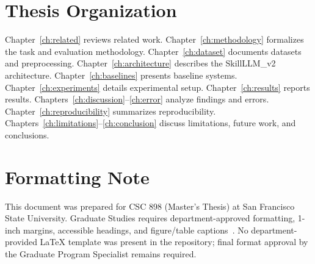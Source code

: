 \section{Thesis Organization}

Chapter~\ref{ch:related} reviews related work.
Chapter~\ref{ch:methodology} formalizes the task and evaluation methodology.
Chapter~\ref{ch:dataset} documents datasets and preprocessing.
Chapter~\ref{ch:architecture} describes the SkillLLM\_v2 architecture.
Chapter~\ref{ch:baselines} presents baseline systems.
Chapter~\ref{ch:experiments} details experimental setup.
Chapter~\ref{ch:results} reports results.
Chapters~\ref{ch:discussion}--\ref{ch:error} analyze findings and errors.
Chapter~\ref{ch:reproducibility} summarizes reproducibility.
Chapters~\ref{ch:limitations}--\ref{ch:conclusion} discuss limitations, future work, and conclusions.

\section{Formatting Note}

This document was prepared for CSC 898 (Master's Thesis) at San Francisco State University.
Graduate Studies requires department-approved formatting, 1-inch margins, accessible headings, and figure/table captions~\cite{sfsugrad2026thesis,sfcs2026thesis}.
No department-provided \LaTeX{} template was present in the repository; final format approval by the Graduate Program Specialist remains required.
